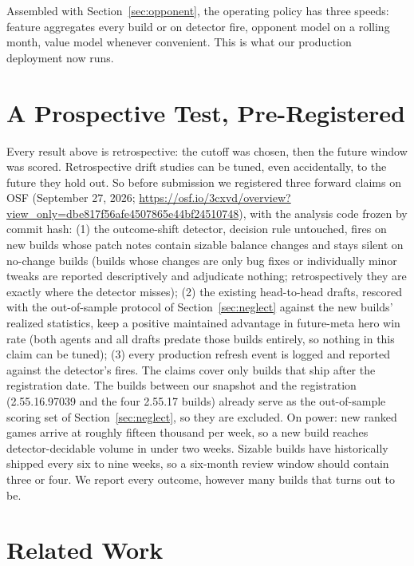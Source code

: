 \documentclass[journal]{IEEEtran}
\newcommand{\preregdate}{September 27, 2026}
\newcommand{\prereglink}{\url{https://osf.io/3cxvd/overview?view_only=dbe817f56afe4507865e44bf24510748}}
\newcommand{\prereglink}{\url{https://osf.io/3cxvd}}
\begin{document}
Assembled with Section~\ref{sec:opponent}, the operating policy has
three speeds: feature aggregates every build or on detector fire,
opponent model on a rolling month, value model whenever convenient. This
is what our production deployment now runs.

\section{A Prospective Test, Pre-Registered}
\label{sec:prospective}

Every result above is retrospective: the cutoff was chosen, then the
future window was scored. Retrospective drift studies can be tuned, even
accidentally, to the future they hold out. So before submission we
registered three forward claims on OSF (\preregdate{};
\prereglink{}), with the analysis code frozen by commit hash: (1) the
outcome-shift detector, decision rule untouched, fires on new builds
whose patch notes contain sizable balance changes and stays silent on
no-change builds (builds whose changes are only bug fixes or
individually minor tweaks are reported descriptively and adjudicate
nothing; retrospectively they are exactly where the detector misses);
(2) the existing head-to-head drafts, rescored with the out-of-sample
protocol of Section~\ref{sec:neglect} against the new builds' realized
statistics, keep a positive maintained advantage in future-meta hero
win rate (both agents and all drafts predate those builds entirely, so
nothing in this claim can be tuned); (3) every production refresh event
is logged and reported against the detector's fires. The claims cover
only builds that ship after the registration date. The builds between
our snapshot and the registration (2.55.16.97039 and the four 2.55.17
builds) already serve as the out-of-sample scoring set of
Section~\ref{sec:neglect}, so they are excluded. On power: new ranked
games arrive at roughly fifteen thousand per week, so a new build
reaches detector-decidable volume in under two weeks. Sizable builds have
historically shipped every six to nine weeks, so a six-month review
window should contain three or four. We report every outcome, however
many builds that turns out to be.

\section{Related Work}
\label{sec:related}
\end{document}
